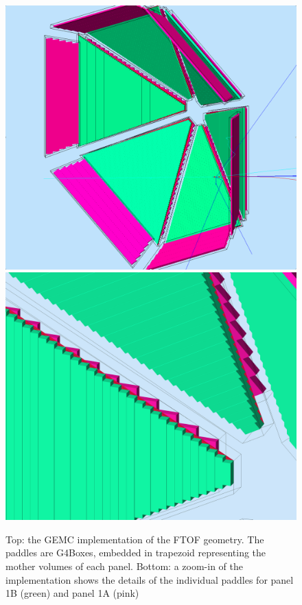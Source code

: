 \begin{figure}
	\centering
	\includegraphics[width=0.95\columnwidth,keepaspectratio]{img/ftofGeometry.png}
	\includegraphics[width=0.95\columnwidth,keepaspectratio]{img/ftofDetail.png}
	\caption{Top: the GEMC implementation of the FTOF geometry. The paddles are G4Boxes, embedded in trapezoid representing the mother volumes of each panel.
            Bottom: a zoom-in of the implementation shows the details of the individual paddles for panel 1B (green) and panel 1A (pink) }
	\label{fig:ftofGeometry}
\end{figure}

